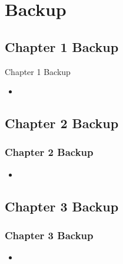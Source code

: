 
\section{Backup}

\subsection{Chapter 1 Backup}
\label{backup_1}

\begin{frame}{Chapter 1 Backup}
	\begin{itemize}
		\item 
	\end{itemize}
	\hyperlink{chapter1}{}
\end{frame}


\subsection{Chapter 2 Backup}
\label{backup_2}

\begin{frame} \frametitle{Chapter 2 Backup}
	\begin{itemize}
		\item 
	\end{itemize}
	\hyperlink{chapter2}{}
\end{frame}

\subsection{Chapter 3 Backup}
\label{backup_3}


\begin{frame}\frametitle{Chapter 3 Backup}
	\begin{itemize}
		\item 
	\end{itemize}
	\hyperlink{chapter3}{}
\end{frame}
